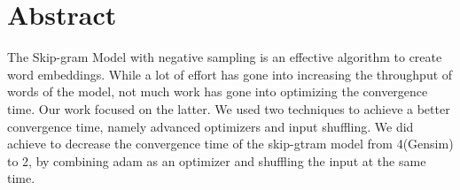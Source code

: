 \chapter*{Abstract}
The Skip-gram Model with negative sampling is an effective algorithm to create word embeddings. While a lot of effort has gone into increasing the throughput of words of the model, not much work has gone into optimizing the convergence time. Our work focused on the latter. We used two techniques to achieve a better convergence time, namely advanced optimizers and input shuffling. We did achieve to decrease the convergence time of the skip-gtram model from 4(Gensim) to 2, by combining adam as an optimizer and shuffling the input at the same time. 
